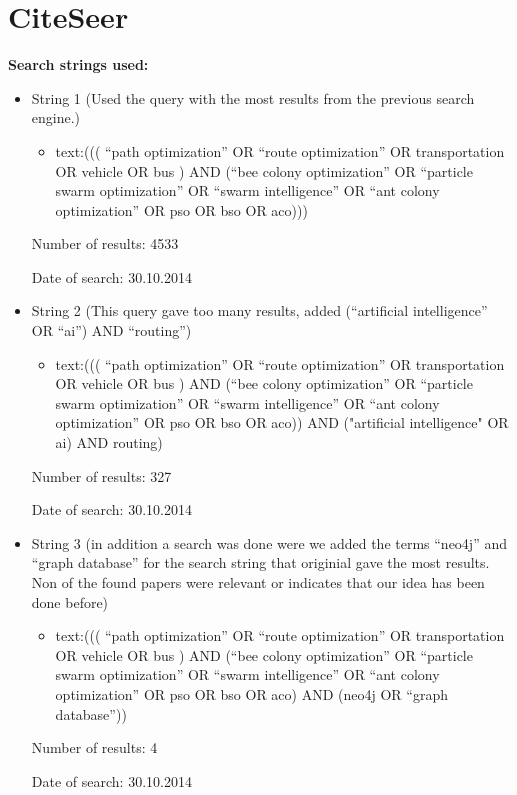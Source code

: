 \section{CiteSeer}
\textbf{Search strings used:}
\begin{itemize}
\item String 1 (Used the query with the most results from the previous search engine.)
\begin{itemize}
\item text:((( ``path optimization'' OR ``route optimization'' OR transportation OR vehicle OR bus ) AND (``bee colony optimization'' OR ``particle swarm optimization'' OR ``swarm intelligence'' OR ``ant colony optimization'' OR pso OR bso OR aco)))
\end{itemize}
\par
Number of results: 4533
\par
Date of search: 30.10.2014
\end{itemize}
\begin{itemize}
\item String 2 (This query gave too many results, added (``artificial intelligence'' OR ``ai'') AND ``routing'')
\begin{itemize}
\item text:((( ``path optimization'' OR ``route optimization'' OR transportation OR vehicle OR bus ) AND (``bee colony optimization'' OR ``particle swarm optimization'' OR ``swarm intelligence'' OR ``ant colony optimization'' OR pso OR bso OR aco)) AND ("artificial intelligence" OR ai) AND routing)
\end{itemize}
\par
Number of results: 327
\par
Date of search: 30.10.2014
\end{itemize}
\begin{itemize}
\item String 3  (in addition a search was done were we added the terms ``neo4j'' and ``graph database'' for the search string that originial gave the most results. Non of the found papers were relevant or indicates that our idea has been done before)
\begin{itemize}
\item text:((( ``path optimization'' OR ``route optimization'' OR transportation OR vehicle OR bus ) AND (``bee colony optimization'' OR ``particle swarm optimization'' OR ``swarm intelligence'' OR ``ant colony optimization'' OR pso OR bso OR aco) AND (neo4j OR ``graph database''))
\end{itemize}
\par
Number of results: 4 
\par
Date of search: 30.10.2014
\end{itemize}


